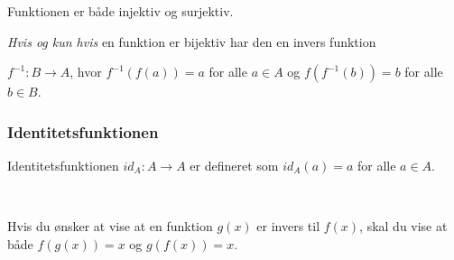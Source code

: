 Funktionen er både injektiv og surjektiv.

\emph{Hvis og kun hvis} en funktion er bijektiv har den en invers funktion

\(f^{-1} : B \to A\), hvor \(f^{-1}(f(a)) = a\) for alle \(a \in A\) og \(f(f^{-1}(b)) = b\) for alle \(b \in B\). 


\subsubsection{Identitetsfunktionen}
Identitetsfunktionen \(id_A : A \to A\) er defineret som \(id_A(a) = a\) for alle \(a \in A\).

\

Hvis du ønsker at vise at en funktion $g(x)$ er invers til $f(x)$, skal du vise at både $f(g(x)) = x$ og $g(f(x)) = x$.